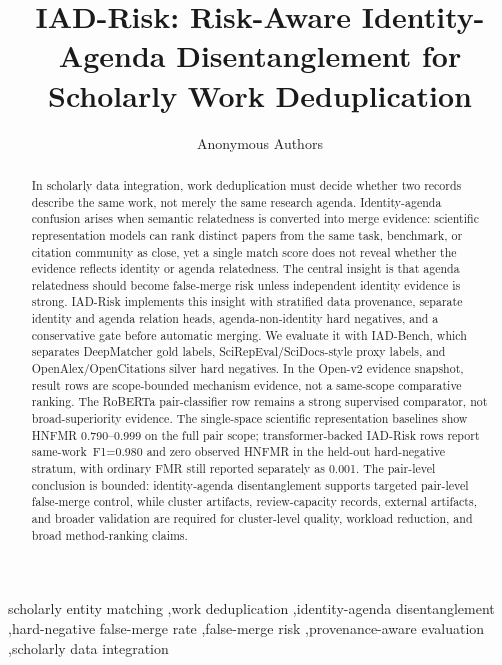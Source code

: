 \documentclass[preprint,12pt]{elsarticle}
\begin{document}
\begin{frontmatter}

\title{IAD-Risk: Risk-Aware Identity-Agenda Disentanglement for Scholarly Work Deduplication}
\author{Anonymous Authors}

\begin{abstract}
In scholarly data integration, work deduplication must decide whether two records describe the same work, not merely the same research agenda. Identity-agenda confusion arises when semantic relatedness is converted into merge evidence: scientific representation models can rank distinct papers from the same task, benchmark, or citation community as close, yet a single match score does not reveal whether the evidence reflects identity or agenda relatedness. The central insight is that agenda relatedness should become false-merge risk unless independent identity evidence is strong. IAD-Risk implements this insight with stratified data provenance, separate identity and agenda relation heads, agenda-non-identity hard negatives, and a conservative gate before automatic merging. We evaluate it with IAD-Bench, which separates DeepMatcher gold labels, SciRepEval/SciDocs-style proxy labels, and OpenAlex/OpenCitations silver hard negatives. In the Open-v2 evidence snapshot, result rows are scope-bounded mechanism evidence, not a same-scope comparative ranking. The RoBERTa pair-classifier row remains a strong supervised comparator, not broad-superiority evidence. The single-space scientific representation baselines show HNFMR 0.790--0.999 on the full pair scope; transformer-backed IAD-Risk rows report \mbox{same-work F1=0.980} and zero observed HNFMR in the held-out hard-negative stratum, with ordinary FMR still reported separately as 0.001. The pair-level conclusion is bounded: identity-agenda disentanglement supports targeted pair-level false-merge control, while cluster artifacts, review-capacity records, external artifacts, and broader validation are required for cluster-level quality, workload reduction, and broad method-ranking claims.
\end{abstract}

\begin{keyword}
scholarly entity matching \sep work deduplication \sep identity-agenda disentanglement \sep hard-negative false-merge rate \sep false-merge risk \sep provenance-aware evaluation \sep scholarly data integration
\end{keyword}

\end{frontmatter}
\end{document}
